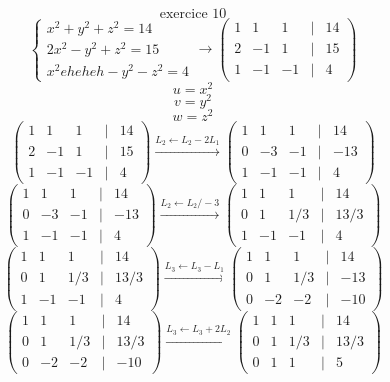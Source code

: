 \documentclass{article}
\begin{document}
\[ \text{exercice 10} \]
\[ \begin{cases} x^2 + y^2 + z^2 = 14 \\ 2x^2 - y^2 + z^2 = 15 \\ x^2eheheh - y^2 - z^2 = 4 \end{cases} \rightarrow \begin{pmatrix} 1 & 1 & 1 & | & 14 \\ 2 & -1 & 1 & | & 15 \\ 1 & -1 & -1 & | & 4 \end{pmatrix} \]
\[ u = x^2 \]
\[ v = y^2 \]
\[ w = z^2 \]
\[ \begin{pmatrix} 1 & 1 & 1 & | & 14 \\ 2 & -1 & 1 & | & 15 \\ 1 & -1 & -1 & | & 4 \end{pmatrix} \xrightarrow{L_2 \leftarrow L_2 - 2L_1} \begin{pmatrix} 1 & 1 & 1 & | & 14 \\ 0 & -3 & -1 & | & -13 \\ 1 & -1 & -1 & | & 4 \end{pmatrix} \]
\[ \begin{pmatrix} 1 & 1 & 1 & | & 14 \\ 0 & -3 & -1 & | & -13 \\ 1 & -1 & -1 & | & 4 \end{pmatrix} \xrightarrow{L_2 \leftarrow L_2 / -3} \begin{pmatrix} 1 & 1 & 1 & | & 14 \\ 0 & 1 & 1/3 & | & 13/3 \\ 1 & -1 & -1 & | & 4 \end{pmatrix} \]
\[ \begin{pmatrix} 1 & 1 & 1 & | & 14 \\ 0 & 1 & 1/3 & | & 13/3 \\ 1 & -1 & -1 & | & 4 \end{pmatrix} \xrightarrow{L_3 \leftarrow L_3 - L_1} \begin{pmatrix} 1 & 1 & 1 & | & 14 \\ 0 & 1 & 1/3 & | & -13 \\ 0 & -2 & -2 & | & -10 \end{pmatrix} \]
\[ \begin{pmatrix} 1 & 1 & 1 & | & 14 \\ 0 & 1 & 1/3 & | & 13/3 \\ 0 & -2 & -2 & | & -10 \end{pmatrix} \xrightarrow{L_3 \leftarrow L_3 + 2L_2} \begin{pmatrix} 1 & 1 & 1 & | & 14 \\ 0 & 1 & 1/3 & | & 13/3 \\ 0 & 1 & 1 & | & 5 \end{pmatrix} \]
\end{document}
